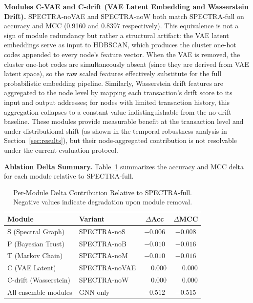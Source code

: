 \documentclass[journal]{IEEEtran}
\begin{document}
\noindent\textbf{Modules C-VAE and C-drift (VAE Latent Embedding and
Wasserstein Drift).}
SPECTRA-noVAE and SPECTRA-noW both match SPECTRA-full on accuracy and MCC
(0.9160 and 0.8397 respectively).
This equivalence is not a sign of module redundancy but rather a structural
artifact: the VAE latent embeddings serve as input to HDBSCAN, which
produces the cluster one-hot codes appended to every node's feature vector.
When the VAE is removed, the cluster one-hot codes are simultaneously absent
(since they are derived from VAE latent space), so the raw scaled features
effectively substitute for the full probabilistic embedding pipeline.
Similarly, Wasserstein drift features are aggregated to the node level by
mapping each transaction's drift score to its input and output addresses;
for nodes with limited transaction history, this aggregation collapses to a
constant value indistinguishable from the no-drift baseline.
These modules provide measurable benefit at the transaction level and under
distributional shift (as shown in the temporal robustness analysis in
Section~\ref{sec:results}), but their node-aggregated contribution is not
resolvable under the current evaluation protocol.

\noindent\textbf{Ablation Delta Summary.}
Table~\ref{tab:ablation_delta} summarizes the accuracy and MCC delta for
each module relative to SPECTRA-full.

\begin{table}[t]
  \centering
  \renewcommand{\arraystretch}{1.15}
  \caption{Per-Module Delta Contribution Relative to SPECTRA-full.
           Negative values indicate degradation upon module removal.}
  \label{tab:ablation_delta}
  \begin{tabular}{@{}llcc@{}}
    \toprule
    \textbf{Module} & \textbf{Variant} & $\Delta$\textbf{Acc} & $\Delta$\textbf{MCC} \\
    \midrule
    S  (Spectral Graph)       & SPECTRA-noS   & $-0.006$ & $-0.008$ \\
    P  (Bayesian Trust)       & SPECTRA-noB   & $-0.010$ & $-0.016$ \\
    T  (Markov Chain)         & SPECTRA-noM   & $-0.010$ & $-0.016$ \\
    C  (VAE Latent)           & SPECTRA-noVAE & $\phantom{-}0.000$ & $\phantom{-}0.000$ \\
    C-drift (Wasserstein)     & SPECTRA-noW   & $\phantom{-}0.000$ & $\phantom{-}0.000$ \\
    \midrule
    All ensemble modules      & GNN-only      & $-0.512$ & $-0.515$ \\
    \bottomrule
  \end{tabular}
\end{table}
\end{document}
